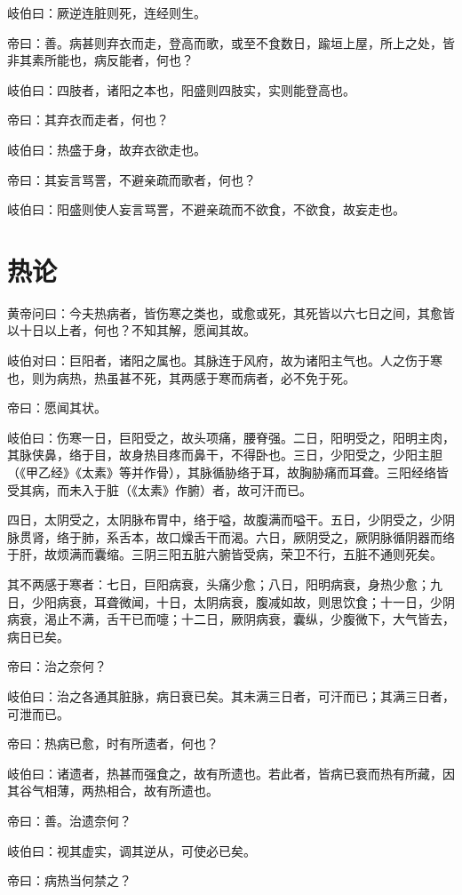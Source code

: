\documentclass{article}%
\begin{document}
岐伯曰：厥逆连脏则死，连经则生。

帝曰：善。病甚则弃衣而走，登高而歌，或至不食数日，踰垣上屋，所上之处，皆非其素所能也，病反能者，何也？

岐伯曰：四肢者，诸阳之本也，阳盛则四肢实，实则能登高也。

帝曰：其弃衣而走者，何也？

岐伯曰：热盛于身，故弃衣欲走也。

帝曰：其妄言骂詈，不避亲疏而歌者，何也？

岐伯曰：阳盛则使人妄言骂詈，不避亲疏而不欲食，不欲食，故妄走也。
\section{热论}
黄帝问曰：今夫热病者，皆伤寒之类也，或愈或死，其死皆以六七日之间，其愈皆以十日以上者，何也？不知其解，愿闻其故。

岐伯对曰：巨阳者，诸阳之属也。其脉连于风府，故为诸阳主气也。人之伤于寒也，则为病热，热虽甚不死，其两感于寒而病者，必不免于死。

帝曰：愿闻其状。

岐伯曰：伤寒一日，巨阳受之，故头项痛，腰脊强。二日，阳明受之，阳明主肉，其脉侠鼻，络于目，故身热目疼而鼻干，不得卧也。三日，少阳受之，少阳主胆（《甲乙经》《太素》等并作骨），其脉循胁络于耳，故胸胁痛而耳聋。三阳经络皆受其病，而未入于脏（《太素》作腑）者，故可汗而已。

四日，太阴受之，太阴脉布胃中，络于嗌，故腹满而嗌干。五日，少阴受之，少阴脉贯肾，络于肺，系舌本，故口燥舌干而渴。六日，厥阴受之，厥阴脉循阴器而络于肝，故烦满而囊缩。三阴三阳五脏六腑皆受病，荣卫不行，五脏不通则死矣。

其不两感于寒者：七日，巨阳病衰，头痛少愈；八日，阳明病衰，身热少愈；九日，少阳病衰，耳聋微闻，十日，太阴病衰，腹减如故，则思饮食；十一日，少阴病衰，渴止不满，舌干已而嚏；十二日，厥阴病衰，囊纵，少腹微下，大气皆去，病日已矣。

帝曰：治之奈何？

岐伯曰：治之各通其脏脉，病日衰已矣。其未满三日者，可汗而已；其满三日者，可泄而已。

帝曰：热病已愈，时有所遗者，何也？

岐伯曰：诸遗者，热甚而强食之，故有所遗也。若此者，皆病已衰而热有所藏，因其谷气相薄，两热相合，故有所遗也。

帝曰：善。治遗奈何？

岐伯曰：视其虚实，调其逆从，可使必已矣。

帝曰：病热当何禁之？
\end{document}
